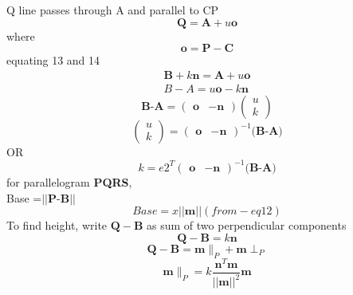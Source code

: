 \documentclass[journal,10pt,twocolumn]{article}
\begin{document}
Q line passes through A and parallel to CP
\begin{equation}
    \boldsymbol{Q}=\boldsymbol{A}+u\boldsymbol{o}
\end{equation}
where
\begin{equation}
	\boldsymbol{o}=\boldsymbol{P}-\boldsymbol{C}    
\end{equation}
equating 13 and 14
\begin{eqnarray}
	\boldsymbol{B}+k\boldsymbol{n}=\boldsymbol{A}+u\boldsymbol{o}\\
    B-A=u\boldsymbol{o}-k\boldsymbol{n}
    \end{eqnarray}
\begin{equation}
	\textbf{B-A}=
\begin{pmatrix}
    \boldsymbol{o} & -\boldsymbol{n}
\end{pmatrix}
\begin{pmatrix}
    u\\
    k
\end{pmatrix}
\end{equation}
\begin{equation}
\begin{pmatrix}
    u\\
    k
\end{pmatrix}
=
\begin{pmatrix}
    \boldsymbol{o} & -\boldsymbol{n}
\end{pmatrix}^{-1}
	\textbf{(B-A)}
\end{equation}
OR
\begin{equation}
k={e2}^T
\begin{pmatrix}
    \boldsymbol{o} & -\boldsymbol{n}
\end{pmatrix}^{-1}
	\textbf{(B-A)}
\end{equation}
for parallelogram \textbf{PQRS}, \\
Base =$||\boldsymbol{P}$-$\boldsymbol{B}||$
\begin{equation}
Base=x||\boldsymbol{m}||(from-eq12)
\end{equation}
To find height, write $\boldsymbol{Q}-\boldsymbol{B}$ as sum of two perpendicular components
\begin{equation}
    \boldsymbol{Q}-\boldsymbol{B}=k\boldsymbol{n}
\end{equation}
\begin{equation}
    \boldsymbol{Q}-\boldsymbol{B}=\boldsymbol{m} \parallel_P +\boldsymbol{m} \perp_P
\end{equation}
\begin{equation}
    \boldsymbol{m} \parallel_P=k{\frac{\boldsymbol{n}^T\boldsymbol{m}}{||\boldsymbol{m}||^2}}\boldsymbol{m}
\end{equation}
\end{document}
